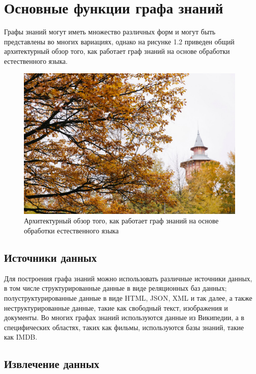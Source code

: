 \section{Основные функции графа знаний}

Графы знаний могут иметь множество различных форм и могут быть представлены во многих вариациях, однако на рисунке 1.2 приведен общий архитектурный обзор того, как работает граф знаний на основе обработки естественного языка.

\begin{figure}[ht!]
    \center
    \includegraphics [scale=0.27] {my_folder/images//spbpu_hydrotower}
    \caption{Архитектурный обзор того, как работает граф знаний на основе обработки естественного языка}
    \label{fig:spbpu_hydrotower}
\end{figure}

\subsection{Источники данных}

Для построения графа знаний можно использовать различные источники данных, в том числе структурированные данные в виде реляционных баз данных; полуструктурированные данные в виде HTML, JSON, XML и так далее, а также неструктурированные данные, такие как свободный текст, изображения и документы. Во многих графах знаний используются данные из Википедии, а в специфических областях, таких как фильмы, используются базы знаний, такие как IMDB.

\subsection{Извлечение данных}

